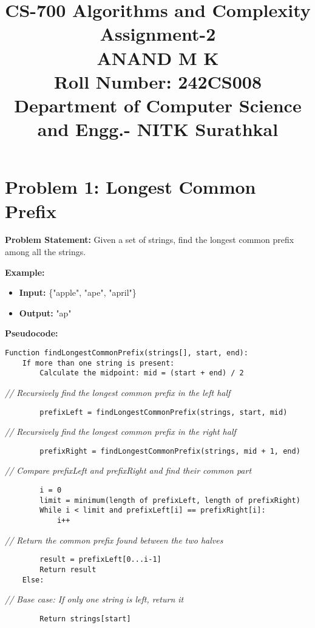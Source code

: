 \documentclass[a4paper,12pt]{report}
\title{
  \vspace{-2em} %
  \textbf{CS-700 Algorithms and Complexity} \\ %
  \large \textbf{Assignment-2} \\ %
  \vspace{1em} %
  \textbf{ANAND M K} \\ %
  Roll Number: 242CS008 \\%
  Department of Computer Science and Engg.- NITK Surathkal
}
\date{} %
\begin{document}
\maketitle

\section*{Problem 1: Longest Common Prefix}

\large \textbf{Problem Statement:}  
Given a set of strings, find the longest common prefix among all the strings.  

\textbf{Example:}
\begin{itemize}
    \item \textbf{Input:} \{"apple", "ape", "april"\}
    \item \textbf{Output:} "ap"
\end{itemize}

\textbf{Pseudocode:}

\begin{tcolorbox}[colback=white, colframe=black, boxrule=0.5pt] %
\ttfamily\small  %
\begin{verbatim}
Function findLongestCommonPrefix(strings[], start, end):
    If more than one string is present:
        Calculate the midpoint: mid = (start + end) / 2
\end{verbatim}
\textit{\color{gray} // Recursively find the longest common prefix in the left half}
\begin{verbatim}
        prefixLeft = findLongestCommonPrefix(strings, start, mid)
\end{verbatim}
\textit{\color{gray} // Recursively find the longest common prefix in the right half}
\begin{verbatim}
        prefixRight = findLongestCommonPrefix(strings, mid + 1, end)
\end{verbatim}
\textit{\color{gray} // Compare prefixLeft and prefixRight and find their common part}
\begin{verbatim}
        i = 0
        limit = minimum(length of prefixLeft, length of prefixRight)
        While i < limit and prefixLeft[i] == prefixRight[i]:
            i++
\end{verbatim}
\textit{\color{gray} // Return the common prefix found between the two halves}
\begin{verbatim}
        result = prefixLeft[0...i-1]
        Return result
    Else:
\end{verbatim}
\textit{\color{gray} // Base case: If only one string is left, return it}
\begin{verbatim}
        Return strings[start]
\end{verbatim}
\end{tcolorbox}
\end{document}
